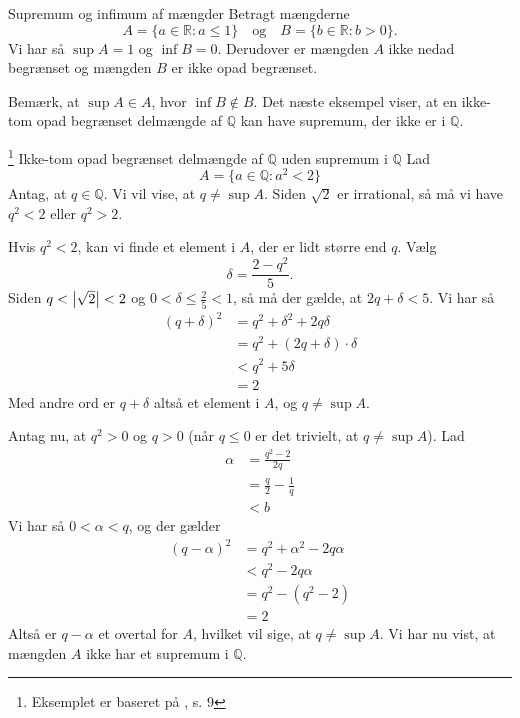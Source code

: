 \begin{example}[label=exa:supinf]{Supremum og infimum af mængder}{}
  Betragt mængderne
  \[
  A=\{ a \in \mathbb{R}:a \leq 1 \}\quad \text{og} \quad B=\{ b \in \mathbb{R}: b>0 \}. 
  \] 
  Vi har så $\sup A=1$ og $\inf B=0$.
  Derudover er mængden $A$ ikke nedad begrænset og mængden $B$ er ikke opad begrænset. 
\end{example}

Bemærk, at $\sup A \in A$, hvor $\inf B \not\in B$.
Det næste eksempel viser, at en ikke-tom opad begrænset delmængde af $\mathbb{Q}$ kan have supremum, der ikke er i $\mathbb{Q}$. 

\begin{example}[label=exa:supQ]{\footnote{Eksemplet er baseret på \cite{Axler2024}, s. 9} Ikke-tom opad begrænset delmængde af $\mathbb{Q}$ uden supremum i $\mathbb{Q}$ }{}
  Lad
  \[
  A=\{ a \in \mathbb{Q}:a^2<2 \} 
  \] 
Antag, at $q \in \mathbb{Q}$.
Vi vil vise, at $q \neq \sup A$.
Siden $\sqrt{2} $ er irrational, så må vi have $q^2<2$ eller $q^2>2$. 

Hvis $q^2<2$, kan vi finde et element i $A$, der er lidt større end $q$.
Vælg
\[
  \delta=\frac{2-q^2}{5}.
\] 
Siden $q < \abs{\sqrt{2} }<2$ og $0<\delta \leq \frac{2}{5} <1$, så må der gælde, at $2q+\delta<5$. 
Vi har så 
\begin{equation*}
  \begin{split}
    \left(q + \delta \right)^2 &=q^2+\delta^2+2q \delta\\
    &=q^2+\left(2q+\delta \right) \cdot \delta \\
    &<q^2+5 \delta \\
    &=2
  \end{split}
  \end{equation*}
  Med andre ord er $q + \delta $ altså et element i $A$, og $q \neq \sup A$.  

  Antag nu, at $q^2>0$ og $q>0$ (når $q \leq 0$ er det trivielt, at $q \neq \sup A$). 
  Lad 
  \begin{equation*}
  \begin{split}
   \alpha &=\frac{q^2-2}{2q}\\
  &=\frac{q}{2}-\frac{1}{q}\\
    &<b
   \end{split}
  \end{equation*}
  Vi har så $0<\alpha <q$, og der gælder 
  \begin{equation*}
  \begin{split}
    \left(q-\alpha \right)^2&=q^2+\alpha ^2 - 2 q \alpha \\
    &<q^2-2q \alpha \\
    &=q^2-(q^2-2)\\
    &=2
  \end{split}
  \end{equation*}
  Altså er $q- \alpha $ et overtal for $A$, hvilket vil sige, at $q \neq \sup A$. 
  Vi har nu vist, at mængden $A$ ikke har et supremum i $\mathbb{Q}$. 
\end{example}

